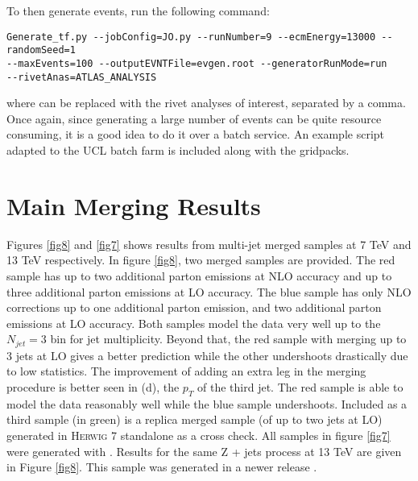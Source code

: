 To then generate events, run the following command:

\begin{verbatim}
Generate_tf.py --jobConfig=JO.py --runNumber=9 --ecmEnergy=13000 --randomSeed=1 
--maxEvents=100 --outputEVNTFile=evgen.root --generatorRunMode=run 
--rivetAnas=ATLAS_ANALYSIS
\end{verbatim}

\noindent where  can be replaced with the rivet analyses of interest, separated by a comma. Once again, since generating a large number of events can be quite resource consuming, it is a good idea to do it over a batch service. An example script adapted to the UCL batch farm is included along with the gridpacks. 

\section{Main Merging Results}

Figures \ref{fig8} and \ref{fig7} shows results from multi-jet merged samples at 7 TeV and 13 TeV respectively. In figure \ref{fig8}, two merged samples are provided. The red sample has up to two additional parton emissions at NLO accuracy and up to three additional parton emissions at LO accuracy. The blue sample has only NLO corrections up to one additional parton emission, and two additional parton emissions at LO accuracy. Both samples model the data very well up to the $N_{jet}=3$ bin for jet multiplicity. Beyond that, the red sample with merging up to 3 jets at LO gives a better prediction while the other undershoots drastically due to low statistics. The improvement of adding an extra leg in the merging procedure is better seen in (d), the $p_T$ of the third jet. The red sample is able to model the data reasonably well while the blue sample undershoots. Included as a third sample (in green) is a replica merged sample (of up to two jets at LO) generated in \textsc{Herwig 7} standalone as a cross check. All samples in figure \ref{fig7} were generated with . Results for the same Z + jets process at 13 TeV are given in Figure \ref{fig8}. This sample was generated in a newer release . 

